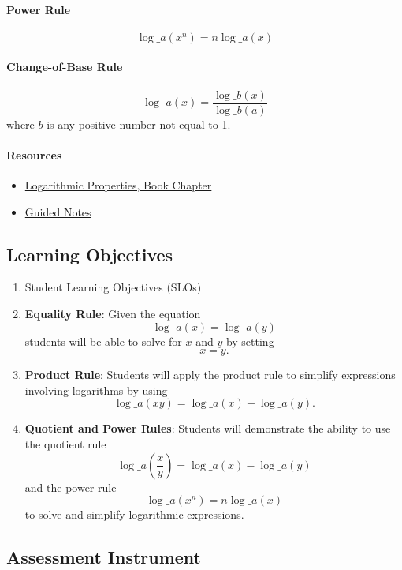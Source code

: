 \paragraph{Power Rule}
$$
\log\_a(x^n) = n \log\_a(x)
$$
\paragraph{Change-of-Base Rule}
$$
\log\_a(x) = \frac{\log\_b(x)}{\log\_b(a)}
$$
where $b$ is any positive number not equal to 1.

\paragraph{Resources}

\begin{itemize}
    \item \href{https://mathresearch.utsa.edu/wikiFiles/MAT1053/Logarithmic\%20Properties/MAT1053_M6.1Logarithmic_Properties.pdf}{Logarithmic Properties, Book Chapter}
    \item \href{https://mathresearch.utsa.edu/wikiFiles/MAT1053/Logarithmic\%20Properties/MAT1053_M6.1Logarithmic_PropertiesGN.pdf}{Guided Notes}
\end{itemize}

\subsection{Learning Objectives}

\begin{enumerate}
    \item Student Learning Objectives (SLOs)
    \item \textbf{Equality Rule}: Given the equation $$ \log\_a(x) = \log\_a(y) $$ students will be able to solve for $x$ and $y$ by setting $$ x = y. $$
    \item \textbf{Product Rule}: Students will apply the product rule to simplify expressions involving logarithms by using $$ \log\_a(xy) = \log\_a(x) + \log\_a(y). $$
    \item \textbf{Quotient and Power Rules}: Students will demonstrate the ability to use the quotient rule $$ \log\_a \left(\frac{x}{y}\right) = \log\_a(x) - \log\_a(y) $$ and the power rule $$ \log\_a(x^n) = n \log\_a(x) $$ to solve and simplify logarithmic expressions.
\end{enumerate}

\subsection{Assessment Instrument}

